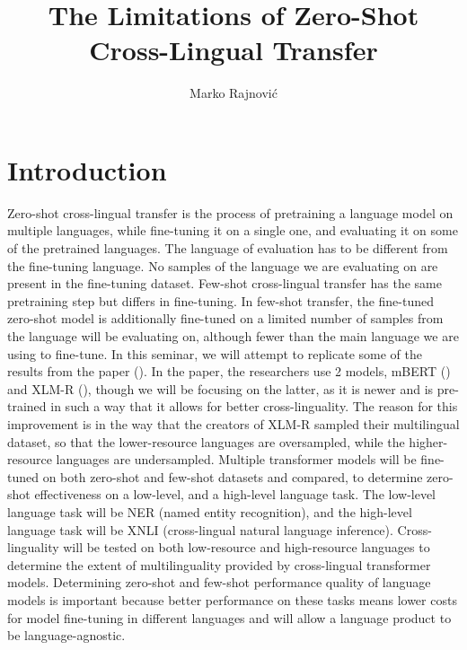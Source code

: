 \documentclass[times, utf8, seminar, english]{fer}
\begin{document}
\title{The Limitations of Zero-Shot Cross-Lingual Transfer}


\author{Marko Rajnović}
\maketitle


\tableofcontents

\chapter[Introduction]{Introduction}
Zero-shot cross-lingual transfer is the process of pretraining a language model on multiple languages, while fine-tuning it on a single one, and evaluating it on some of the pretrained languages. The language of evaluation has to be different from the fine-tuning language. No samples of the language we are evaluating on are present in the fine-tuning dataset. Few-shot cross-lingual transfer has the same pretraining step but differs in fine-tuning. In few-shot transfer, the fine-tuned zero-shot model is additionally fine-tuned on a limited number of samples from the language will be evaluating on, although fewer than the main language we are using to fine-tune. In this seminar, we will attempt to replicate some of the results from the paper (\cite{zero}). In the paper, the researchers use 2 models, mBERT (\cite{devlin-etal-2019-bert}) and XLM-R (\cite{conneau2019unsupervised}), though we will be focusing on the latter, as it is newer and is pre-trained in such a way that it allows for better cross-linguality. The reason for this improvement is in the way that the creators of XLM-R sampled their multilingual dataset, so that the lower-resource languages are oversampled, while the higher-resource languages are undersampled.  Multiple transformer models will be fine-tuned on both zero-shot and few-shot datasets and compared, to determine zero-shot effectiveness on a low-level, and a high-level language task. The low-level language task will be NER (named entity recognition), and the high-level language task will be XNLI (cross-lingual natural language inference). Cross-linguality will be tested on both low-resource and high-resource languages to determine the extent of multilinguality provided by cross-lingual transformer models. Determining zero-shot and few-shot performance quality of language models is important because better performance on these tasks means lower costs for model fine-tuning in different languages and will allow a language product to be language-agnostic.
\end{document}
